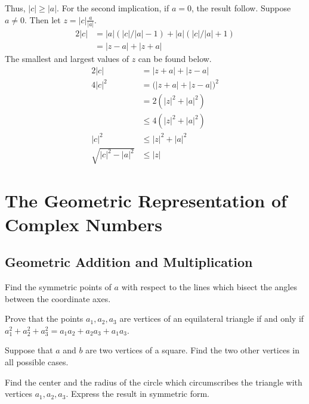 \begin{exercise}
  Thus, \(\lvert c\rvert\geq\lvert a\rvert\).
  For the second implication, if \(a = 0\), the result follow.
  Suppose \(a\neq 0\).
  Then let \(z = \lvert c\rvert\frac{a}{\lvert a\rvert}\).
  \begin{align*}
    2\lvert c\rvert & = \lvert a\rvert(\lvert c\rvert/\lvert a\rvert - 1) +
                      \lvert a\rvert(\lvert c\rvert/\lvert a\rvert + 1)\\
                    & = \lvert z - a\rvert + \lvert z + a\rvert
  \end{align*}
  The smallest and largest values of \(z\) can be found below.
  \begin{align*}
    2\lvert c\rvert & = \lvert z + a\rvert + \lvert z - a\rvert\\
    4\lvert c\rvert^2 & =
                        \bigl(\lvert z + a\rvert + \lvert z - a\rvert\bigr)^2\\
                    & = 2(\lvert z\rvert^2 + \lvert a\rvert^2)\\
                    & \leq 4(\lvert z\rvert^2 + \lvert a\rvert^2)\\
    \lvert c\rvert^2 & \leq \lvert z\rvert^2 + \lvert a\rvert^2\\
    \sqrt{\lvert c\rvert^2 - \lvert a\rvert^2} & \leq \lvert z\rvert
  \end{align*}
\end{exercise}

\section{The Geometric Representation of Complex Numbers}

\subsection{Geometric Addition and Multiplication}

\begin{exercise}
\item
  Find the symmetric points of \(a\) with respect to the lines which bisect the
  angles between the coordinate axes.
\item
  Prove that the points \(a_1,a_2,a_3\) are vertices of an equilateral triangle
  if and only if \(a_1^2 + a_2^2 + a_3^2 = a_1a_2 + a_2a_3 + a_1a_3\).
\item
  Suppose that \(a\) and \(b\) are two vertices of a square.
  Find the two other vertices in all possible cases.
\item
  Find the center and the radius of the circle which circumscribes the triangle
  with vertices \(a_1,a_2,a_3\).
  Express the result in symmetric form.
\end{exercise}

